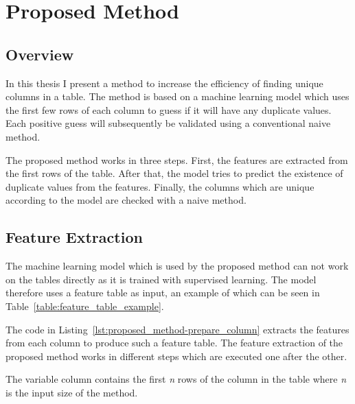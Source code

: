 \chapter{Proposed Method}\label{chap:proposed_method}
\section{Overview}\label{sec:overview}
In this thesis I present a method to increase the efficiency of finding unique columns in a table. The method is based on a machine learning model which uses the first few rows of each column to guess if it will have any duplicate values. Each positive guess will subsequently be validated using a conventional naive method.

The proposed method works in three steps. First, the features are extracted from the first rows of the table. After that, the model tries to predict the existence of duplicate values from the features. Finally, the columns which are unique according to the model are checked with a naive method.



\section{Feature Extraction}\label{sec:extracted_features}
The machine learning model which is used by the proposed method can not work on the tables directly as it is trained with supervised learning. The model therefore uses a feature table as input, an example of which can be seen in Table~\ref{table:feature_table_example}.




The code in Listing~\ref{lst:proposed_method-prepare_column} extracts the features from each column to produce such a feature table. The feature extraction of the proposed method works in different steps which are executed one after the other.

The variable column contains the first \textit{n} rows of the column in the table where \textit{n} is the input size of the method.

